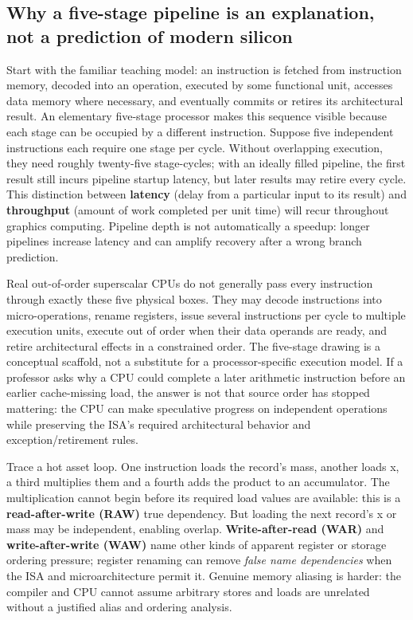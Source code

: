 \subsection{Why a five-stage pipeline is an explanation, not a prediction of modern silicon}\label{05-engine-i-ch007-why-a-five-stage-pipeline-is-an-explanation-not-a-prediction-of-modern-silicon}

Start with the familiar teaching model: an instruction is fetched from instruction memory, decoded into an operation, executed by some functional unit, accesses data memory where necessary, and eventually commits or retires its architectural result. An elementary five-stage processor makes this sequence visible because each stage can be occupied by a different instruction. Suppose five independent instructions each require one stage per cycle. Without overlapping execution, they need roughly twenty-five stage-cycles; with an ideally filled pipeline, the first result still incurs pipeline startup latency, but later results may retire every cycle. This distinction between \textbf{latency} (delay from a particular input to its result) and \textbf{throughput} (amount of work completed per unit time) will recur throughout graphics computing. Pipeline depth is not automatically a speedup: longer pipelines increase latency and can amplify recovery after a wrong branch prediction.

Real out-of-order superscalar CPUs do not generally pass every instruction through exactly these five physical boxes. They may decode instructions into micro-operations, rename registers, issue several instructions per cycle to multiple execution units, execute out of order when their data operands are ready, and retire architectural effects in a constrained order. The five-stage drawing is a conceptual scaffold, not a substitute for a processor-specific execution model. If a professor asks why a CPU could complete a later arithmetic instruction before an earlier cache-missing load, the answer is not that source order has stopped mattering: the CPU can make speculative progress on independent operations while preserving the ISA's required architectural behavior and exception/retirement rules.

Trace a hot asset loop. One instruction loads the record's mass, another loads x, a third multiplies them and a fourth adds the product to an accumulator. The multiplication cannot begin before its required load values are available: this is a \textbf{read-after-write (RAW)} true dependency. But loading the next record's x or mass may be independent, enabling overlap. \textbf{Write-after-read (WAR)} and \textbf{write-after-write (WAW)} name other kinds of apparent register or storage ordering pressure; register renaming can remove \emph{false name dependencies} when the ISA and microarchitecture permit it. Genuine memory aliasing is harder: the compiler and CPU cannot assume arbitrary stores and loads are unrelated without a justified alias and ordering analysis.

